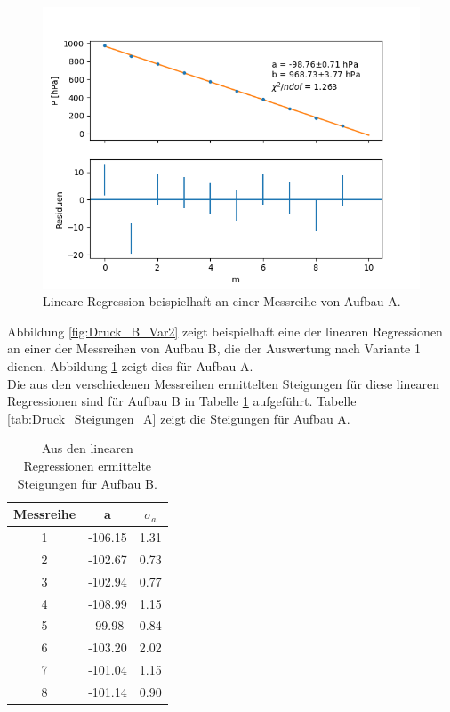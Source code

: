 \documentclass[12pt,a4paper]{article}
\begin{document}
\begin{figure}
\centering
\includegraphics[scale=0.8]{Bilder/Druck_A_Var2.png}
\caption{Lineare Regression beispielhaft an einer Messreihe von Aufbau A.}
\label{fig:Druck_A_Var2}
\end{figure}

Abbildung \ref{fig:Druck_B_Var2} zeigt beispielhaft eine der linearen Regressionen an einer der Messreihen von Aufbau B, die der Auswertung nach Variante 1 dienen. Abbildung \ref{fig:Druck_A_Var2} zeigt dies für Aufbau A. \\
Die aus den verschiedenen Messreihen ermittelten Steigungen für diese linearen Regressionen sind für Aufbau B in Tabelle \ref{tab:Druck_Steigungen_B} aufgeführt. Tabelle \ref{tab:Druck_Steigungen_A} zeigt die Steigungen für Aufbau A.

\begin{table}
\begin{center}
\begin{tabular}{|c|c|c|}
\hline 
Messreihe & a & $\sigma _a$ \\ 
\hline 
1 & -106.15 & 1.31 \\ 
\hline 
2 & -102.67 & 0.73 \\ 
\hline 
3 & -102.94 & 0.77 \\ 
\hline 
4 & -108.99 & 1.15 \\ 
\hline 
5 & -99.98 & 0.84 \\ 
\hline 
6 & -103.20 & 2.02 \\ 
\hline 
7 & -101.04 & 1.15 \\ 
\hline 
8 & -101.14 & 0.90 \\ 
\hline 
\end{tabular} 
\caption{Aus den linearen Regressionen ermittelte Steigungen für Aufbau B.}
\label{tab:Druck_Steigungen_B}
\end{center}
\end{table}
\end{document}
